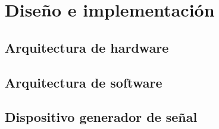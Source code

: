\chapter{Diseño e implementación}

\label{cap:DisenioImplementacion}

\section{Arquitectura de hardware}
\label{sec:hardware}

\section{Arquitectura de software}
\label{sec:software}

\section{Dispositivo generador de señal}
\label{sec:generador}
